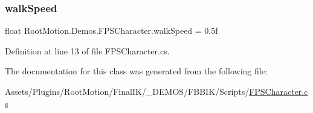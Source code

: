 \subsubsection{\texorpdfstring{walk\+Speed}{walkSpeed}}
{\footnotesize\ttfamily float Root\+Motion.\+Demos.\+F\+P\+S\+Character.\+walk\+Speed = 0.\+5f}



Definition at line 13 of file F\+P\+S\+Character.\+cs.



The documentation for this class was generated from the following file\+:\begin{DoxyCompactItemize}
\item 
Assets/\+Plugins/\+Root\+Motion/\+Final\+I\+K/\+\_\+\+D\+E\+M\+O\+S/\+F\+B\+B\+I\+K/\+Scripts/\mbox{\hyperlink{_f_p_s_character_8cs}{F\+P\+S\+Character.\+cs}}\end{DoxyCompactItemize}
